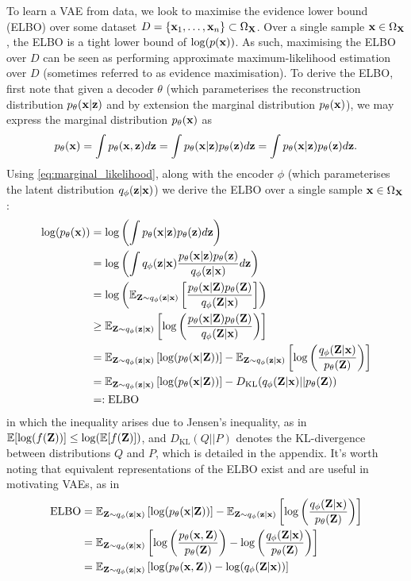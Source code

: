 \documentclass[11pt]{article}
\begin{document}
To learn a VAE from data, we look to maximise the evidence lower bound (ELBO) over some dataset $D=\{\mathbf{x}_1,\dots,\mathbf{x}_n\}\subset\Omega_{\mathbf{X}}$. Over a single sample $\mathbf{x}\in\Omega_{\mathbf{X}}$, the ELBO is a tight lower bound of $\log(p(\mathbf{x}))$. As such, maximising the ELBO over $D$ can be seen as performing approximate maximum-likelihood estimation over $D$ (sometimes referred to as evidence maximisation). To derive the ELBO, first note that given a decoder $\theta$ (which parameterises the reconstruction distribution $p_{\theta}(\mathbf{x}|\mathbf{z})$ and by extension the marginal distribution $p_{\theta}(\mathbf{x})$), we may express the marginal distribution $p_{\theta}(\mathbf{x})$ as
\begin{equation}
\label{eq:marginal_likelihood}
p_{\theta}(\mathbf{x})
=
\int p_{\theta}(\mathbf{x},\mathbf{z})d\mathbf{z}
=
\int p_{\theta}(\mathbf{x}|\mathbf{z})p_{\theta}(\mathbf{z})d\mathbf{z}
=
\int p_{\theta}(\mathbf{x}|\mathbf{z})p_{\theta}(\mathbf{z})d\mathbf{z}.
\end{equation}
Using \autoref{eq:marginal_likelihood}, along with the encoder $\phi$ (which parameterises the latent distribution $q_{\phi}(\mathbf{z}|\mathbf{x})$) we derive the ELBO over a single sample $\mathbf{x}\in\Omega_{\mathbf{X}}$:
\begin{align*}
    \log(p_{\theta}(\mathbf{x}))
    &=
    \log\left(\int p_{\theta}(\mathbf{x}|\mathbf{z})p_{\theta}(\mathbf{z})d\mathbf{z}\right)\\
    &=
    \log\left(\int q_{\phi}(\mathbf{z}|\mathbf{x})\frac{p_{\theta}(\mathbf{x}|\mathbf{z})p_{\theta}(\mathbf{z})}{q_{\phi}(\mathbf{z}|\mathbf{x})}d\mathbf{z}\right)\\
    &=
    \log\left(\mathbb{E}_{\mathbf{Z}\sim q_{\phi}(\mathbf{z}|\mathbf{x})}\left[\frac{p_{\theta}(\mathbf{x}|\mathbf{Z})p_{\theta}(\mathbf{Z})}{q_{\phi}(\mathbf{Z}|\mathbf{x})}\right]\right)\\
    &\geq
    \mathbb{E}_{\mathbf{Z}\sim q_{\phi}(\mathbf{z}|\mathbf{x})}\left[\log\left(\frac{p_{\theta}(\mathbf{x}|\mathbf{Z})p_{\theta}(\mathbf{Z})}{q_{\phi}(\mathbf{Z}|\mathbf{x})}\right)\right]\\
    &=
    \mathbb{E}_{\mathbf{Z}\sim q_{\phi}(\mathbf{z}|\mathbf{x})}\left[\log(p_{\theta}(\mathbf{x}|\mathbf{Z}))\right]-\mathbb{E}_{\mathbf{Z}\sim q_{\phi}(\mathbf{z}|\mathbf{x})}\left[\log\left(\frac{q_{\phi}(\mathbf{Z}|\mathbf{x})}{p_{\theta}(\mathbf{Z})}\right)\right]\\
    &=
    \mathbb{E}_{\mathbf{Z}\sim q_{\phi}(\mathbf{z}|\mathbf{x})}\left[\log(p_{\theta}(\mathbf{x}|\mathbf{Z}))\right]-D_{\text{KL}}(q_{\phi}(\mathbf{Z}|\mathbf{x})||p_{\theta}(\mathbf{Z}))\\
    &=:
    \text{ELBO}
\end{align*}
in which the inequality arises due to Jensen's inequality, as in $\mathbb{E}[\log(f(\mathbf{Z}))]\leq\log(\mathbb{E}[f(\mathbf{Z})])$, and $D_\text{KL}(Q||P)$ denotes the KL-divergence between distributions $Q$ and $P$, which is detailed in the appendix. It's worth noting that equivalent representations of the ELBO exist and are useful in motivating VAEs, as in
\begin{align*}
    \text{ELBO}
    &=
    \mathbb{E}_{\mathbf{Z}\sim q_{\phi}(\mathbf{z}|\mathbf{x})}\left[\log(p_{\theta}(\mathbf{x}|\mathbf{Z}))\right]-\mathbb{E}_{\mathbf{Z}\sim q_{\phi}(\mathbf{z}|\mathbf{x})}\left[\log\left(\frac{q_{\phi}(\mathbf{Z}|\mathbf{x})}{p_{\theta}(\mathbf{Z})}\right)\right]\\
    &=
    \mathbb{E}_{\mathbf{Z}\sim q_{\phi}(\mathbf{z}|\mathbf{x})}\left[\log\left(\frac{p_{\theta}(\mathbf{x},\mathbf{Z})}{p_{\theta}(\mathbf{Z})}\right)-\log\left(\frac{q_{\phi}(\mathbf{Z}|\mathbf{x})}{p_{\theta}(\mathbf{Z})}\right)\right]\\
    &=
    \mathbb{E}_{\mathbf{Z}\sim q_{\phi}(\mathbf{z}|\mathbf{x})}\left[\log(p_{\theta}(\mathbf{x},\mathbf{Z}))-\log(q_{\phi}(\mathbf{Z}|\mathbf{x}))\right]
\end{align*}
\end{document}
